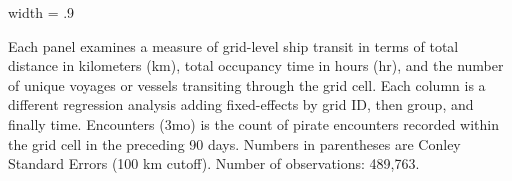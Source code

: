 \begin{table}
\begin{adjustbox}{width = .9\textwidth}
\begin{threeparttable}
\begin{tablenotes}
Each panel examines a measure of grid-level ship transit in terms of total distance in kilometers (km), 
total occupancy time in hours (hr), and the number of unique voyages or vessels transiting through the grid cell. 
Each column is a different regression analysis adding fixed-effects by grid ID, then group, and finally time.
Encounters (3mo) is the count of pirate encounters recorded within the grid cell in the preceding 90 days.
Numbers in parentheses are Conley Standard Errors (100 km cutoff). Number of observations: 489,763.
\end{tablenotes}
\end{threeparttable}
\end{adjustbox}
\end{table}
